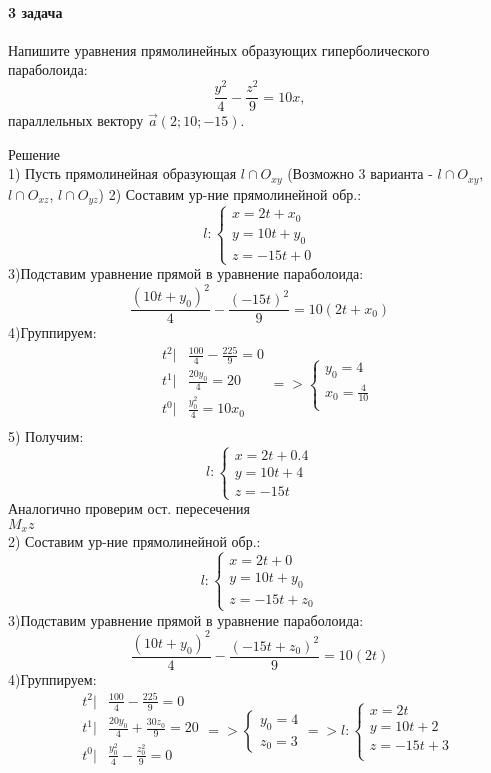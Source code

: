 \documentclass[a4paper,14pt]{extreport} %
\begin{document}
\noindent
\paragraph{3 задача}
Напишите уравнения прямолинейных образующих гиперболического параболоида:
\[
\frac{y^2}{4} - \frac{z^2}{9} = 10x,
\]
параллельных вектору $\vec{a}(2; 10; -15)$.

\noindent
Решение \\
1) Пусть прямолинейная образующая $ l \cap O_{xy} $ (Возможно 3 варианта - $ l \cap O_{xy} $,  $ l \cap O_{xz} $, $ l \cap O_{yz} $)
2) Составим ур-ние прямолинейной обр.: 
\[
  l: \begin{cases}
    x = 2t + x_0\\ 
    y = 10t + y_0\\
    z = -15t + 0
  \end{cases}
\]
3)Подставим уравнение прямой в уравнение параболоида:
\[
  \frac{(10t+y_0)^2}{4} - \frac{(-15t)^2}{9} = 10(2t+x_0)
\]
4)Группируем: 
\[
\begin{aligned}
  &t^2|   &\frac{100}{4} - \frac{225}{9} = 0\\
  &t^1|   &\frac{20y_0}{4} =20\\
  &t^0|  &\frac{y_0^2}{4} = 10x_0\\
\end{aligned} =>
  \begin{cases}
    y_0=4\\ 
    x_0 = \frac{4}{10}\\
  \end{cases}
\]  
5) Получим:
\[
  l:\begin{cases}
    x = 2t+0.4\\ 
    y = 10t + 4\\ 
    z = -15t
  \end{cases}
\]
Аналогично проверим ост. пересечения\\ 
$M_xz$\\

2) Составим ур-ние прямолинейной обр.: 
\[
  l: \begin{cases}
    x = 2t + 0\\ 
    y = 10t + y_0\\
    z = -15t + z_0
  \end{cases}
\]
3)Подставим уравнение прямой в уравнение параболоида:
\[
  \frac{(10t+y_0)^2}{4} - \frac{(-15t+z_0)^2}{9} = 10(2t)
\]
4)Группируем: 
\[
\begin{aligned}
  &t^2|   &\frac{100}{4} - \frac{225}{9} = 0\\
  &t^1|   &\frac{20y_0}{4} + \frac{30z_0}{9}=20\\
  &t^0|  &\frac{y_0^2}{4}-\frac{z_0^2}{9} = 0\\
\end{aligned} =>
  \begin{cases}
    y_0=4\\ 
    z_0 = 3
  \end{cases} =>l: \begin{cases}
    x = 2t\\ 
    y = 10t+2\\ 
    z = -15t +3\\
  \end{cases}
\]  
\end{document}
